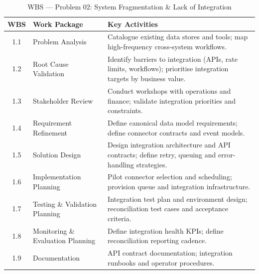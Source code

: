 \documentclass[12pt,a4paper]{report}
\begin{document}
\begin{table}[H]
\centering
\renewcommand{\arraystretch}{1.25}
\small
\begin{tabularx}{\textwidth}{|c|p{4.2cm}|X|}
\hline
\rowcolor{secondary}
\textbf{WBS} & \textbf{Work Package} & \textbf{Key Activities} \\
\hline
1.1 & Problem Analysis & Catalogue existing data stores and tools; map high-frequency cross-system workflows. \\
\hline
1.2 & Root Cause Validation & Identify barriers to integration (APIs, rate limits, workflows); prioritise integration targets by business value. \\
\hline
1.3 & Stakeholder Review & Conduct workshops with operations and finance; validate integration priorities and constraints. \\
\hline
1.4 & Requirement Refinement & Define canonical data model requirements; define connector contracts and event models. \\
\hline
1.5 & Solution Design & Design integration architecture and API contracts; define retry, queuing and error-handling strategies. \\
\hline
1.6 & Implementation Planning & Pilot connector selection and scheduling; provision queue and integration infrastructure. \\
\hline
1.7 & Testing \& Validation Planning & Integration test plan and environment design; reconciliation test cases and acceptance criteria. \\
\hline
1.8 & Monitoring \& Evaluation Planning & Define integration health KPIs; define reconciliation reporting cadence. \\
\hline
1.9 & Documentation & API contract documentation; integration runbooks and operator procedures. \\
\hline
\end{tabularx}
\caption{WBS --- Problem 02: System Fragmentation \& Lack of Integration}
\end{table}
\end{document}
